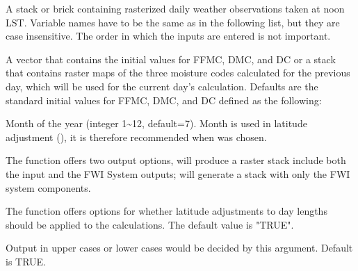 \documentclass[a4paper]{book}
\begin{document}
\begin{Arguments}
\begin{ldescription}
\item[\code{input}] A stack or brick containing rasterized daily weather
observations taken at noon LST. Variable names have to be the same as in the
following list, but they are case insensitive. The order in which the inputs
are entered is not important.



\item[\code{init}] A vector that contains the initial values for FFMC, DMC, and DC
or a stack that contains raster maps of the three moisture codes calculated
for the previous day, which will be used for the current day's calculation.
Defaults are the standard initial values for FFMC, DMC, and DC defined as
the following: 


\item[\code{mon}] Month of the year (integer 1\textasciitilde{}12, default=7). Month is used in
latitude adjustment (), it is therefore recommended when
 was chosen.

\item[\code{out}] The function offers two output options,  will
produce a raster stack include both the input and the FWI System outputs;
 will generate a stack with only the FWI system components.

\item[\code{lat.adjust}] The function offers options for whether latitude
adjustments to day lengths should be applied to the calculations. The
default value is "TRUE".

\item[\code{uppercase}] Output in upper cases or lower cases would be decided by
this argument. Default is TRUE.
\end{ldescription}
\end{Arguments}
\end{document}
